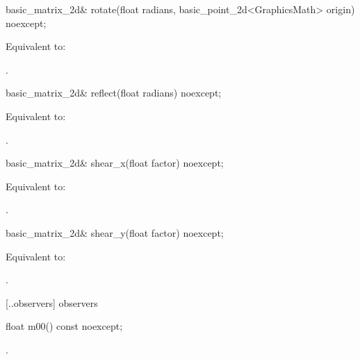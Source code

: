 %
\begin{itemdecl}
basic_matrix_2d& rotate(float radians, basic_point_2d<GraphicsMath> origin) noexcept;
\end{itemdecl}
\begin{itemdescr}
\pnum
\effects
Equivalent to: 

\pnum
\returns
{}.
\end{itemdescr}

%
\begin{itemdecl}
basic_matrix_2d& reflect(float radians) noexcept;
\end{itemdecl}
\begin{itemdescr}
\pnum
\effects
Equivalent to: 

\pnum
\returns
{}.
\end{itemdescr}

%
\begin{itemdecl}
basic_matrix_2d& shear_x(float factor) noexcept;
\end{itemdecl}
\begin{itemdescr}
\pnum
\effects
Equivalent to: 

\pnum
\returns
{}.
\end{itemdescr}

%
\begin{itemdecl}
basic_matrix_2d& shear_y(float factor) noexcept;
\end{itemdecl}
\begin{itemdescr}
\pnum
\effects
Equivalent to: 

\pnum
\returns
{}.
\end{itemdescr}

 [\iotwod.\matrixtwod.observers] { observers}

%
\begin{itemdecl}
float m00() const noexcept;
\end{itemdecl}
\begin{itemdescr}
\pnum
\returns
{}.
\end{itemdescr}

